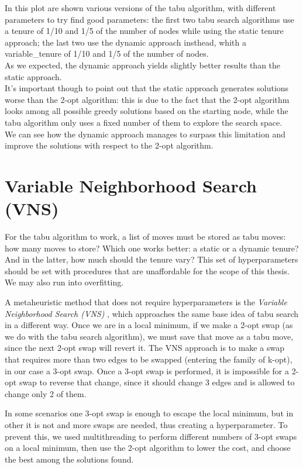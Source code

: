 In this plot are shown various versions of the tabu algorithm, with different parameters to try find good parameters: the first two tabu search algorithms use a tenure of 1/10 and 1/5 of the number of nodes while using the static tenure approach; the last two use the dynamic approach insthead, whith a variable\_tenure of 1/10 and 1/5 of the number of nodes.\\

As we expected, the dynamic approach yields slightly better results than the static approach.\\
It's important though to point out that the static approach generates solutions worse than the 2-opt algorithm: this is due to the fact that the 2-opt algorithm looks among all possible greedy solutions based on the starting node, while the tabu algorithm only uses a fixed number of them to explore the search space.\\
We can see how the dynamic approach manages to surpass this limitation and improve the solutions with respect to the 2-opt algorithm.

\section{Variable Neighborhood Search (VNS)}

For the tabu algorithm to work, a list of moves must be stored as tabu moves: how many moves to store? Which one works better: a static or a dynamic tenure? And in the latter, how much should the tenure vary? This set of hyperparameters should be set with procedures that are unaffordable for the scope of this thesis. We may also run into overfitting.

A metaheuristic method that does not require hyperparameters is the \textit{Variable Neighborhood Search (VNS)} \cite{Hansen2019}, which approaches the same base idea of tabu search in a different way. Once we are in a local minimum, if we make a 2-opt swap (as we do with the tabu search algorithm), we must save that move as a tabu move, since the next 2-opt swap will revert it. The VNS approach is to make a swap that requires more than two edges to be swapped (entering the family of k-opt), in our case a 3-opt swap. Once a 3-opt swap is performed, it is impossible for a 2-opt swap to reverse that change, since it should change 3 edges and is allowed to change only 2 of them.

In some scenarios one 3-opt swap is enough to escape the local minimum, but in other it is not and more swaps are needed, thus creating a hyperparameter. To prevent this, we used multithreading to perform different numbers of 3-opt swaps on a local minimum, then use the 2-opt algorithm to lower the cost, and choose the best among the solutions found.

